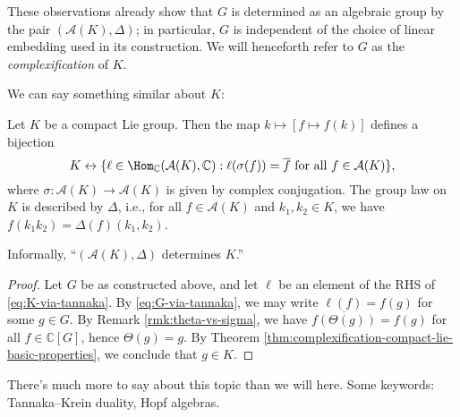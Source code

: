 \documentclass[reqno]{amsart} 
\begin{document}
These observations already show that $G$ is determined as an algebraic group by the pair $(\mathcal{A}(K),\Delta)$; in particular, $G$ is independent of the choice of linear embedding used in its construction.  We will henceforth refer to $G$ as the \emph{complexification} of $K$.

We can say something similar about $K$:

\begin{theorem}
  Let $K$ be a compact Lie group.  Then the map $k \mapsto [f \mapsto f(k)]$ defines a bijection
  \begin{equation}\label{eq:K-via-tannaka}
    K \leftrightarrow \{\ell \in
    \Hom_{\mathbb{C}}(\mathcal{A}(K),\mathbb{C})
    :
    \ell(\sigma(f)) = \overline{f}
    \text{ for all } f \in \mathcal{A}(K)
    \},
  \end{equation}
  where $\sigma : \mathcal{A}(K) \rightarrow \mathcal{A}(K)$ is given by complex conjugation.  The group law on $K$ is described by $\Delta$, i.e., for all $f \in \mathcal{A}(K)$ and $k_1,k_2 \in K$, we have $f(k_1 k_2) = \Delta(f) (k_1,k_2)$.
\end{theorem}
Informally, ``$(\mathcal{A}(K),\Delta)$ determines $K$.''
\begin{proof}
  Let $G$ be as constructed above, and let $\ell$ be an element of the RHS of \eqref{eq:K-via-tannaka}.  By \eqref{eq:G-via-tannaka}, we may write $\ell(f) = f(g)$ for some $g \in G$.  By Remark \ref{rmk:theta-vs-sigma}, we have $\overline{f(\Theta(g))} = f(g)$ for all $f \in \mathbb{C}[G]$, hence $\Theta(g) = g$.  By Theorem \ref{thm:complexification-compact-lie-basic-properties}, we conclude that $g \in K$.
\end{proof}

There's much more to say about this topic than we will here.  Some keywords: Tannaka--Krein duality, Hopf algebras.
\end{document}
